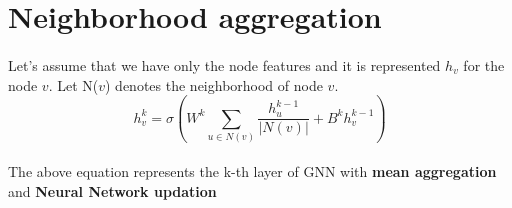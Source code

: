 \section{Neighborhood aggregation}
    \paragraph{} Let's assume that we have only the node features and it is represented $h_{v}$ for the node $v$. Let N($v$) denotes the neighborhood of node $v$.
    \begin{equation}
        h_{v}^k = \sigma(W^k\sum_{u \in N(v)}\frac{h_u^{k-1}}{|N(v)|}+B^k h_{v}^{k-1})
    \end{equation}
    \paragraph{} The above equation represents the k-th layer of GNN with \textbf{mean aggregation} and \textbf{Neural Network updation}

